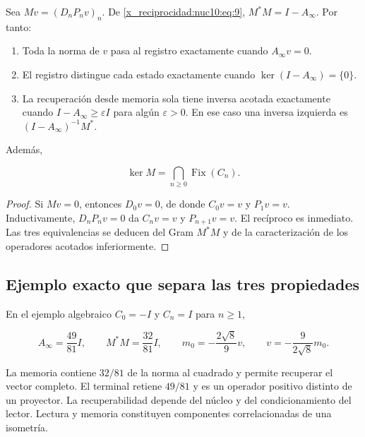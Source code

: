 Sea \(Mv=(D_nP_nv)_n\). De \eqref{x_reciprocidad:nuc10:eq:9}, \(M^*M=I-A_\infty\). Por tanto:

\begin{enumerate}
\item Toda la norma de \(v\) pasa al registro exactamente cuando \(A_\infty v=0\).
\item El registro distingue cada estado exactamente cuando \(\ker(I-A_\infty)=\{0\}\).
\item La recuperación desde memoria sola tiene inversa acotada exactamente cuando
\(I-A_\infty\geq\varepsilon I\) para algún \(\varepsilon>0\).
En ese caso una inversa izquierda es \((I-A_\infty)^{-1}M^*\).
\end{enumerate}

Además,



\begin{equation}
\boxed{\ker M=\bigcap_{n\ge0}\operatorname{Fix}(C_n).}
\label{x_reciprocidad:nuc10:eq:12}
\end{equation}



\begin{proof}
Si \(Mv=0\), entonces \(D_0v=0\), de donde \(C_0v=v\)
y \(P_1v=v\). Inductivamente, \(D_nP_nv=0\) da \(C_nv=v\) y
\(P_{n+1}v=v\). El recíproco es inmediato. Las tres equivalencias se
deducen del Gram \(M^*M\) y de la caracterización de los operadores
acotados inferiormente.
\end{proof}

\subsection{Ejemplo exacto que separa las tres propiedades}

En el ejemplo algebraico \(C_0=-I\) y \(C_n=I\) para \(n\geq1\),



\begin{equation}
A_\infty=\frac{49}{81}I,\qquad M^*M=\frac{32}{81}I,
\qquad m_0=-\frac{2\sqrt8}{9}v,
\qquad v=-\frac9{2\sqrt8}m_0.
\label{x_reciprocidad:nuc10:eq:13}
\end{equation}



La memoria contiene \(32/81\) de la norma al cuadrado y permite recuperar el vector completo. El terminal retiene \(49/81\) y es un operador positivo distinto de un proyector. La recuperabilidad depende del núcleo y del condicionamiento del lector. Lectura y memoria constituyen componentes correlacionadas de una isometría.

